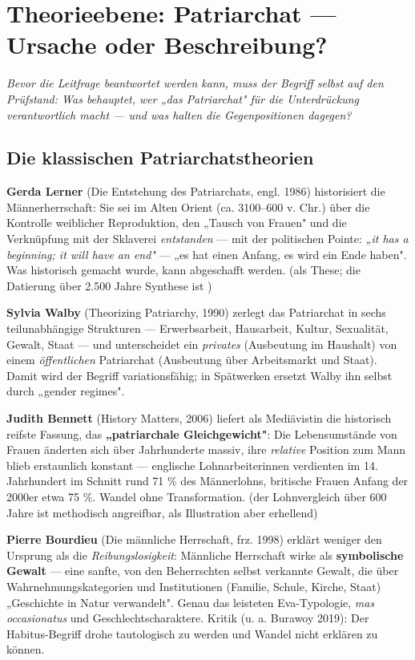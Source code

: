 \documentclass[11pt,a4paper,ngerman]{scrartcl}
\newcommand{\chipbase}[2]{\hspace{0pt}{\footnotesize\textcolor{#1}{[\textsc{#2}]}}}
\newcommand{\chipbelegt}[1]{\chipbase{chipgreen}{#1}}
\newcommand{\chipplausibel}[1]{\chipbase{chipamber}{#1}}
\newcommand{\chipumstritten}[1]{\chipbase{chipred}{#1}}
\begin{document}
\section{Theorieebene: Patriarchat — Ursache oder Beschreibung?}

\noindent\textit{Bevor die Leitfrage beantwortet werden kann, muss der Begriff selbst auf den Prüfstand: Was behauptet, wer „das Patriarchat" für die Unterdrückung verantwortlich macht — und was halten die Gegenpositionen dagegen?}
\medskip

\subsection*{Die klassischen Patriarchatstheorien}

\textbf{Gerda Lerner} (Die Entstehung des Patriarchats, engl. 1986) historisiert die Männerherrschaft: Sie sei im Alten Orient (ca. 3100–600 v. Chr.) über die Kontrolle weiblicher Reproduktion, den „Tausch von Frauen" und die Verknüpfung mit der Sklaverei \emph{entstanden} — mit der politischen Pointe: \emph{„it has a beginning; it will have an end"} — „es hat einen Anfang, es wird ein Ende haben". Was historisch gemacht wurde, kann abgeschafft werden. \chipbelegt{belegt} (als These; die Datierung über 2.500 Jahre Synthese ist \chipumstritten{umstritten})

\textbf{Sylvia Walby} (Theorizing Patriarchy, 1990) zerlegt das Patriarchat in sechs teilunabhängige Strukturen — Erwerbsarbeit, Hausarbeit, Kultur, Sexualität, Gewalt, Staat — und unterscheidet ein \emph{privates} (Ausbeutung im Haushalt) von einem \emph{öffentlichen} Patriarchat (Ausbeutung über Arbeitsmarkt und Staat). Damit wird der Begriff variationsfähig; in Spätwerken ersetzt Walby ihn selbst durch „gender regimes". \chipbelegt{belegt}

\textbf{Judith Bennett} (History Matters, 2006) liefert als Mediävistin die historisch reifste Fassung, das \textbf{„patriarchale Gleichgewicht"}: Die Lebensumstände von Frauen änderten sich über Jahrhunderte massiv, ihre \emph{relative} Position zum Mann blieb erstaunlich konstant — englische Lohnarbeiterinnen verdienten im 14. Jahrhundert im Schnitt rund 71 \% des Männerlohns, britische Frauen Anfang der 2000er etwa 75 \%. Wandel ohne Transformation. \chipbelegt{belegt} (der Lohnvergleich über 600 Jahre ist methodisch angreifbar, als Illustration aber erhellend)

\textbf{Pierre Bourdieu} (Die männliche Herrschaft, frz. 1998) erklärt weniger den Ursprung als die \emph{Reibungslosigkeit}: Männliche Herrschaft wirke als \textbf{symbolische Gewalt} — eine sanfte, von den Beherrschten selbst verkannte Gewalt, die über Wahrnehmungskategorien und Institutionen (Familie, Schule, Kirche, Staat) „Geschichte in Natur verwandelt". Genau das leisteten Eva-Typologie, \emph{mas occasionatus} und Geschlechtscharaktere. Kritik (u. a. Burawoy 2019): Der Habitus-Begriff drohe tautologisch zu werden und Wandel nicht erklären zu können. \chipplausibel{plausibel}
\end{document}
